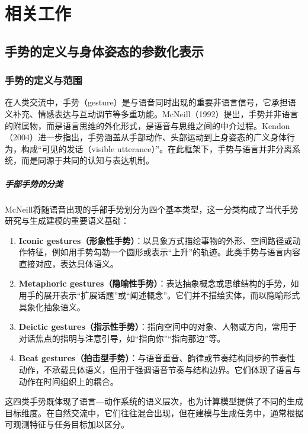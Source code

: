 
\chapter{相关工作}

\section{手势的定义与身体姿态的参数化表示}

\subsection{手势的定义与范围}

在人类交流中，手势（gesture）是与语音同时出现的重要非语言信号，它承担语义补充、情感表达与互动调节等多重功能。McNeill（1992）\cite{mcneill_1992_hand}提出，手势并非语言的附属物，而是语言思维的外化形式，是语音与思维之间的中介过程。Kendon（2004）\cite{kendon_2004_gesture}进一步指出，手势涵盖从手部动作、头部运动到上身姿态的广义身体行为，构成“可见的发话（visible utterance）”。在此框架下，手势与语言并非分离系统，而是同源于共同的认知与表达机制。

\paragraph{手部手势的分类}
McNeill将随语音出现的手部手势划分为四个基本类型，这一分类构成了当代手势研究与生成建模的重要语义基础：

\begin{enumerate}
  \item \textbf{Iconic gestures（形象性手势）}：以具象方式描绘事物的外形、空间路径或动作特征，例如用手势勾勒一个圆形或表示“上升”的轨迹。此类手势与语言内容直接对应，表达具体语义。
  \item \textbf{Metaphoric gestures（隐喻性手势）}：表达抽象概念或思维结构的手势，如用手的展开表示“扩展话题”或“阐述概念”。它们并不描绘实体，而以隐喻形式具象化抽象语义。
  \item \textbf{Deictic gestures（指示性手势）}：指向空间中的对象、人物或方向，常用于对话焦点的指明与注意引导，如“指向你”“指向那边”等。
  \item \textbf{Beat gestures（拍击型手势）}：与语音重音、韵律或节奏结构同步的节奏性动作，不承载具体语义，但用于强调语音节奏与结构边界。它们体现了语言与动作在时间组织上的耦合。
\end{enumerate}

这四类手势既体现了语言—动作系统的语义层次，也为计算模型提供了不同的生成目标维度。在自然交流中，它们往往混合出现，但在建模与生成任务中，通常根据可观测特征与任务目标加以区分。

